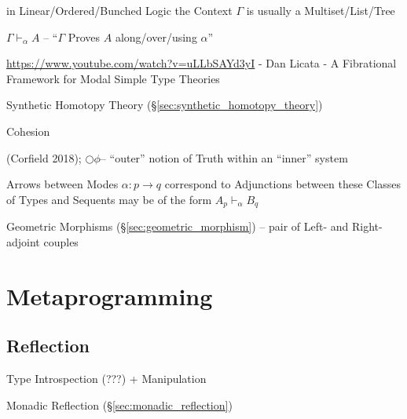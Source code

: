 in Linear/Ordered/Bunched Logic the Context $\Gamma$ is usually a
Multiset/List/Tree

$\Gamma \vdash_\alpha A$ -- ``$\Gamma$ Proves $A$ along/over/using
$\alpha$''

\asterism

\url{https://www.youtube.com/watch?v=uLLbSAYd3yI} - Dan Licata - A Fibrational
Framework for Modal Simple Type Theories

Synthetic Homotopy Theory (\S\ref{sec:synthetic_homotopy_theory})

Cohesion

\asterism

(Corfield 2018); $\bigcirc\phi$-- ``outer'' notion of Truth within an ``inner''
system

Arrows between Modes $\alpha : p \rightarrow q$ correspond to Adjunctions
between these Classes of Types and Sequents may be of the form
$A_p \vdash_\alpha B_q$

Geometric Morphisms (\S\ref{sec:geometric_morphism}) -- pair of Left- and
Right-adjoint couples



\section{Metaprogramming}\label{sec:metaprogramming}

\subsection{Reflection}\label{sec:type_reflection}

Type Introspection (???) + Manipulation

Monadic Reflection (\S\ref{sec:monadic_reflection})
